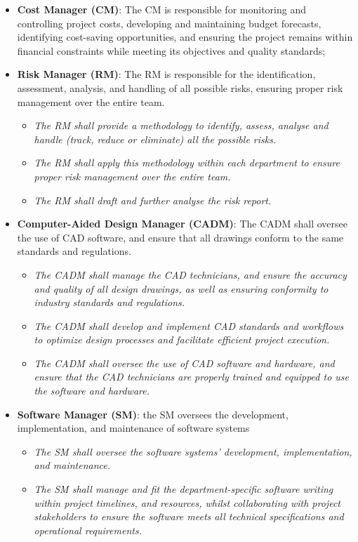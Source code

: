 \begin{itemize}
    \item \textbf{Cost Manager (CM)}: The CM is responsible for monitoring and controlling project costs, developing and maintaining budget forecasts, identifying cost-saving opportunities, and ensuring the project remains within financial constraints while meeting its objectives and quality standards;
    \item \textbf{Risk Manager (RM)}: The RM is responsible for the identification, assessment, analysis, and handling of all possible risks, ensuring proper risk management over the entire team.
    \begin{itemize}
        \item \textit{The RM shall provide a methodology to identify, assess, analyse and handle (track, reduce or eliminate) all the possible risks.}
        \item \textit{The RM shall apply this methodology within each department to ensure proper risk management over the entire team.}
        \item \textit{The RM shall draft and further analyse the risk report.}
    \end{itemize}
    \item \textbf{Computer-Aided Design Manager (CADM)}: The CADM shall oversee the use of CAD software, and ensure that all drawings conform to the same standards and regulations.
    \begin{itemize}
        \item \textit{The CADM shall manage the CAD technicians, and ensure the accuracy and quality of all design drawings, as well as ensuring conformity to industry standards and regulations.}
        \item \textit{The CADM shall develop and implement CAD standards and workflows to optimize design processes and facilitate efficient project execution.}
        \item \textit{The CADM shall oversee the use of CAD software and hardware, and ensure that the CAD technicians are properly trained and equipped to use the software and hardware.}
    \end{itemize}
    \item \textbf{Software Manager (SM)}: the SM oversees the development, implementation, and maintenance of software systems
    \begin{itemize}
        \item \textit{The SM shall oversee the software systems' development, implementation, and maintenance.}
        \item \textit{The SM shall manage and fit the department-specific software writing within project timelines, and resources, whilst collaborating with project stakeholders to ensure the software meets all technical specifications and operational requirements.}

\end{itemize}
\end{itemize}
